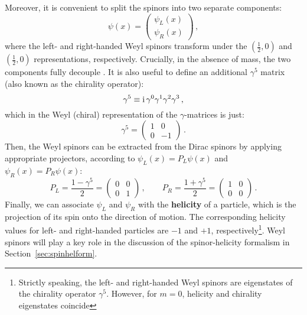 \documentclass[main.tex]{subfiles}
\begin{document}
Moreover, it is convenient to split the spinors into two separate components:
\begin{equation}
    \psi(x) = 
    \begin{pmatrix}
        \psi_L(x) \\
        \psi_R(x)
    \end{pmatrix}\,,
\end{equation}
where the left- and right-handed Weyl spinors transform under the $\left(\frac{1}{2}, 0 \right)$ and $\left(\frac{1}{2}, 0 \right)$ representations, respectively. Crucially, in the absence of mass, the two components fully decouple . It is also useful to define an additional $\gamma^5$ matrix (also known as the chirality operator): 
\begin{equation}
    \gamma^5 \equiv \mathrm{i}\, \gamma^0 \gamma^1 \gamma^2 \gamma^3\,,
\end{equation}
which in the Weyl (chiral) representation of the $\gamma$-matrices is just:
\begin{equation}
    \gamma^5 = 
    \begin{pmatrix}
        1 & 0 \\
        0 & -1
    \end{pmatrix}\,.
\end{equation}
Then, the Weyl spinors can be extracted from the Dirac spinors by applying appropriate projectors, according to $\psi_L(x) = P_L\psi(x)$ and $\psi_R(x) = P_R\psi(x)$:
\begin{equation}
    P_L = \frac{1-\gamma^5}{2} = 
    \begin{pmatrix}
        0 & 0 \\
        0 & 1
    \end{pmatrix}\,,
    \qquad
    P_R = \frac{1+\gamma^5}{2} = 
    \begin{pmatrix}
        1 & 0 \\
        0 & 0
    \end{pmatrix}\,.
\end{equation}
Finally, we can associate $\psi_L$ and $\psi_R$ with the \textbf{helicity} of a particle, which is the projection of its spin onto the direction of motion. The corresponding helicity values for left- and right-handed particles are $-1$ and $+1$, respectively\footnote{Strictly speaking, the left- and right-handed Weyl spinors are eigenstates of the chirality operator $\gamma^5$. However, for $m=0$, helicity and chirality eigenstates coincide}.
Weyl spinors will play a key role in the discussion of the spinor-helicity formalism in Section~\ref{sec:spinhelform}.
\end{document}
